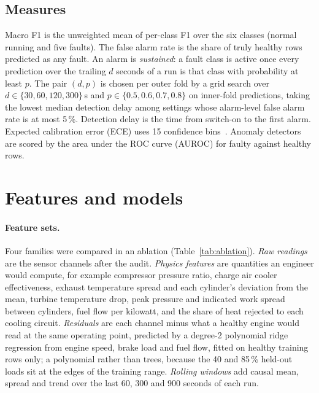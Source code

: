 \documentclass[10pt]{article}
\begin{document}
\subsection{Measures}

Macro F1 is the unweighted mean of per-class F1 over the six classes (normal running and five faults). The false alarm rate is the share of truly healthy rows predicted as any fault. An alarm is \emph{sustained}: a fault class is active once every prediction over the trailing $d$ seconds of a run is that class with probability at least $p$. The pair $(d,p)$ is chosen per outer fold by a grid search over $d \in \{30, 60, 120, 300\}$\,s and $p \in \{0.5, 0.6, 0.7, 0.8\}$ on inner-fold predictions, taking the lowest median detection delay among settings whose alarm-level false alarm rate is at most 5\,\%. Detection delay is the time from switch-on to the first alarm. Expected calibration error (ECE) uses 15 confidence bins~\cite{naeini2015ece}. Anomaly detectors are scored by the area under the ROC curve (AUROC) for faulty against healthy rows.

\section{Features and models}

\paragraph{Feature sets.} Four families were compared in an ablation (Table~\ref{tab:ablation}). \emph{Raw readings} are the sensor channels after the audit. \emph{Physics features} are quantities an engineer would compute, for example compressor pressure ratio, charge air cooler effectiveness, exhaust temperature spread and each cylinder's deviation from the mean, turbine temperature drop, peak pressure and indicated work spread between cylinders, fuel flow per kilowatt, and the share of heat rejected to each cooling circuit. \emph{Residuals} are each channel minus what a healthy engine would read at the same operating point, predicted by a degree-2 polynomial ridge regression from engine speed, brake load and fuel flow, fitted on healthy training rows only; a polynomial rather than trees, because the 40 and 85\,\% held-out loads sit at the edges of the training range. \emph{Rolling windows} add causal mean, spread and trend over the last 60, 300 and 900 seconds of each run.
\end{document}
